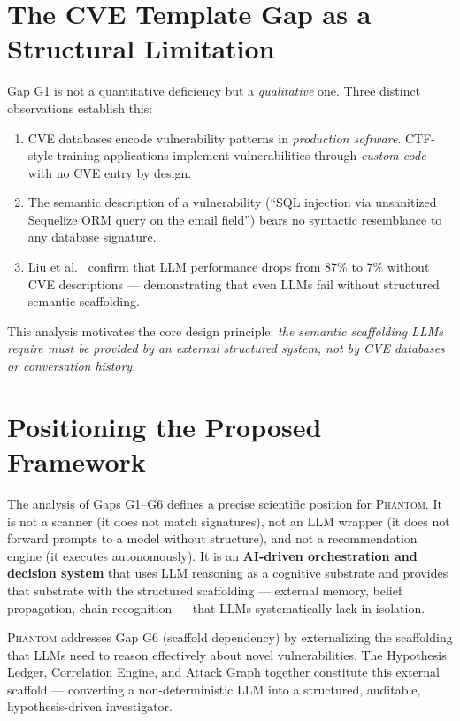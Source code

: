 \documentclass[12pt,a4paper,oneside,openany]{book}
\newcommand{\Phantom}{\textsc{Phantom}}
\begin{document}
\section{The CVE Template Gap as a Structural Limitation}

Gap G1 is not a quantitative deficiency but a \textit{qualitative} one. Three distinct observations establish this:

\begin{enumerate}
\item CVE databases encode vulnerability patterns in \textit{production software}. CTF-style training applications implement vulnerabilities through \textit{custom code} with no CVE entry by design.
\item The semantic description of a vulnerability (``SQL injection via unsanitized Sequelize ORM query on the email field'') bears no syntactic resemblance to any database signature.
\item Liu et al.\ \cite{liu2024gpts} confirm that LLM performance drops from 87\% to 7\% without CVE descriptions --- demonstrating that even LLMs fail without structured semantic scaffolding.
\end{enumerate}

This analysis motivates the core design principle: \textit{the semantic scaffolding LLMs require must be provided by an external structured system, not by CVE databases or conversation history}.

\section{Positioning the Proposed Framework}

The analysis of Gaps G1--G6 defines a precise scientific position for \Phantom{}. It is not a scanner (it does not match signatures), not an LLM wrapper (it does not forward prompts to a model without structure), and not a recommendation engine (it executes autonomously). It is an \textbf{AI-driven orchestration and decision system} that uses LLM reasoning as a cognitive substrate and provides that substrate with the structured scaffolding --- external memory, belief propagation, chain recognition --- that LLMs systematically lack in isolation.

\begin{researchbox}
\Phantom{} addresses Gap G6 (scaffold dependency) by externalizing the scaffolding that LLMs need to reason effectively about novel vulnerabilities. The Hypothesis Ledger, Correlation Engine, and Attack Graph together constitute this external scaffold --- converting a non-deterministic LLM into a structured, auditable, hypothesis-driven investigator.
\end{researchbox}
\end{document}
